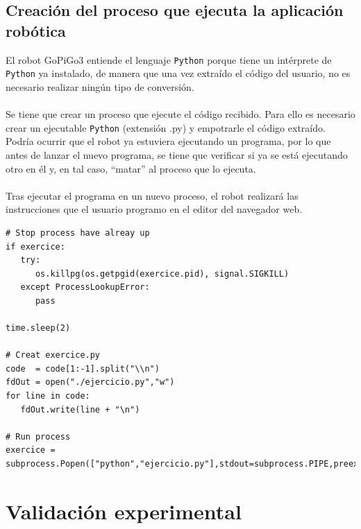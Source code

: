 \documentclass{report}
\begin{document}
\subsection{Creación del proceso que ejecuta la aplicación robótica}

El robot GoPiGo3 entiende el lenguaje \texttt{Python} porque tiene un intérprete de \texttt{Python} ya instalado, de manera que una vez extraído el código del usuario, no es necesario realizar ningún tipo de conversión.
\\
\\
Se tiene que crear un proceso que ejecute el código recibido. Para ello es necesario crear un ejecutable \texttt{Python} (extensión .py) y empotrarle el código extraído. Podría ocurrir que el robot ya estuviera ejecutando un programa, por lo que antes de lanzar el nuevo programa, se tiene que verificar si ya se está ejecutando otro en él y, en tal caso, “matar” al proceso que lo ejecuta.
\\
\\
Tras ejecutar el programa en un nuevo proceso, el robot realizará las instrucciones que el usuario programo en el editor del navegador web.
\\
\begin{lstlisting}[frame=single,breaklines=true, label=Creación del proceso con el programa para el robot, caption=Creación del proceso con el programa para el robot,  captionpos=b]
# Stop process have alreay up
if exercice:
   try:
      os.killpg(os.getpgid(exercice.pid), signal.SIGKILL)
   except ProcessLookupError:
      pass

time.sleep(2)
    
# Creat exercice.py
code  = code[1:-1].split("\\n")
fdOut = open("./ejercicio.py","w")
for line in code:
   fdOut.write(line + "\n")
    
# Run process
exercice = subprocess.Popen(["python","ejercicio.py"],stdout=subprocess.PIPE,preexec_fn=os.setsid)
\end{lstlisting}

\section{Validación experimental}
\end{document}
